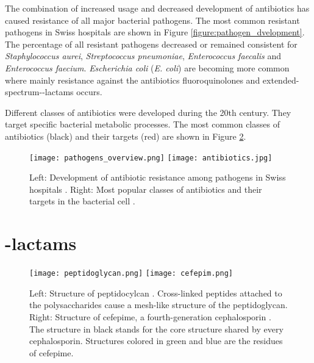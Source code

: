 The combination of increased usage and decreased development of antibiotics has caused resistance of all major bacterial pathogens. The most common resistant pathogens in Swiss hospitals are shown in Figure \ref{figure:pathogen_dvelopment}. The percentage of all resistant pathogens decreased or remained consistent for \textit{Staphylococcus aurei}, \textit{Streptococcus pneumoniae}, \textit{Enterococcus faecalis} and \textit{Enterococcus faecium}. \textit{Escherichia coli} (\textit{E. coli}) are becoming more common where mainly resistance against the antibiotics fluoroquinolones and extended-spectrum-\textbeta-lactams occurs. 

Different classes of antibiotics were developed during the 20th century. They target specific bacterial metabolic processes. The most common classes of antibiotics (black) and their targets (red) are shown in Figure \ref{figure:antibiotics}.
\begin{figure}
	\texttt{[image: pathogens\_overview.png]}
	\texttt{[image: antibiotics.jpg]}
	\caption{Left: Development of antibiotic resistance among pathogens in Swiss hospitals \cite{swiss_hospitals_pathogens}. Right: Most popular classes of antibiotics and their targets in the bacterial cell \cite{wright_english:_2010}.}
	\label{figure:pathogen_dvelopment}
	\label{figure:cefepim}
\end{figure}
\newpage
\section{\textbeta-lactams}
\begin{figure}[b]
	\texttt{[image: peptidoglycan.png]}
	\texttt{[image: cefepim.png]}
	\caption{Left: Structure of peptidocylcan \cite{noauthor_bacteria:_nodate}. Cross-linked peptides attached to the polysaccharides cause a mesh-like structure of the peptidoglycan. Right: Structure of cefepime, a fourth-generation cephalosporin \cite{noauthor_datei:cefepim_nodate}. The structure in black stands for the core structure shared by every cephalosporin. Structures colored in green and blue are the residues of cefepime.}
	\label{figure:antibiotics}
\end{figure}
